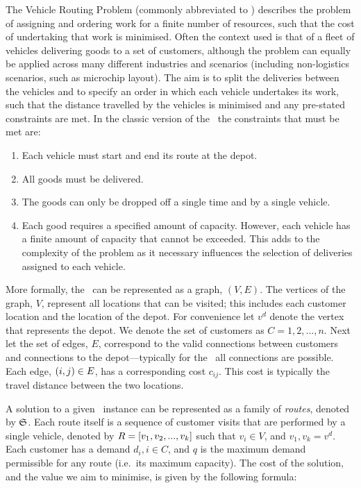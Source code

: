 The Vehicle Routing Problem (commonly abbreviated to \VRP) describes the problem of assigning and ordering work for a finite number of resources, such that the cost of undertaking that work is minimised. Often the context used is that of a fleet of vehicles delivering goods to a set of customers, although the problem can equally be applied across many different industries and scenarios (including non-logistics scenarios, such as microchip layout). The aim is to split the deliveries between the vehicles and to specify an order in which each vehicle undertakes its work, such that the distance travelled by the vehicles is minimised and any pre-stated constraints are met. In the classic version of the \VRP\ the constraints that must be met are: 

\begin{enumerate}
   \item Each vehicle must start and end its route at the depot.
   \item All goods must be delivered.
   \item The goods can only be dropped off a single time and by a single vehicle.
   \item Each good requires a specified amount of capacity. However, each vehicle has a finite amount of capacity that cannot be exceeded. This adds to the complexity of the problem as it necessary influences the selection of deliveries assigned to each vehicle.
\end{enumerate}


More formally, the \VRP\ can be represented as a graph, $(V,E)$. The vertices of the graph, $V$, represent all locations that can be visited; this includes each customer location and the location of the depot. For convenience let $v^d$ denote the vertex that represents the depot. We denote the set of customers as $C = 1,2,...,n$. Next let the set of edges, $E$, correspond to the valid connections between customers and connections to the depot---typically for the \VRP\ all connections are possible. Each edge, $(i,j) \in E$, has a corresponding cost $c_{ij}$. This cost is typically the travel distance between the two locations.

A solution to a given \VRP\ instance can be represented as a family of \emph{routes}, denoted by $\mathfrak{S}$. Each route itself is a sequence of customer visits that are performed by a single vehicle, denoted by $R = [v_1, v_2,..., v_k]$ such that $v_i \in V$, and $v_1, v_k = v^d$. Each customer has a demand $d_i, i \in C$, and $q$ is the maximum demand permissible for any route (i.e.~its maximum capacity). The cost of the solution, and the value we aim to minimise, is given by the following formula:

